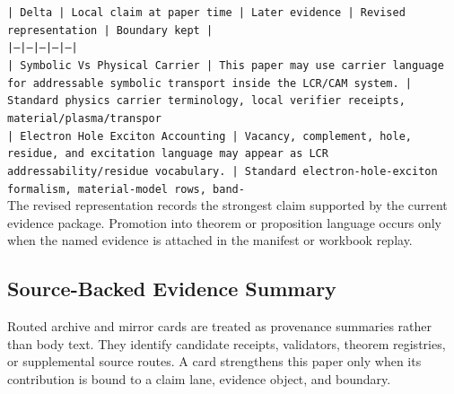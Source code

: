\documentclass[11pt]{article}
\begin{document}
\noindent\texttt{| Delta | Local claim at paper time | Later evidence | Revised representation | Boundary kept |}\\
\noindent\texttt{|---|---|---|---|---|}\\
\noindent\texttt{| Symbolic Vs Physical Carrier | This paper may use carrier language for addressable symbolic transport inside the LCR/CAM system. | Standard physics carrier terminology, local verifier receipts, material/plasma/transpor}\\
\noindent\texttt{| Electron Hole Exciton Accounting | Vacancy, complement, hole, residue, and excitation language may appear as LCR addressability/residue vocabulary. | Standard electron-hole-exciton formalism, material-model rows, band-}\\

The revised representation records the strongest claim supported by the current evidence package. Promotion into theorem or proposition language occurs only when the named evidence is attached in the manifest or workbook replay.

\subsection*{Source-Backed Evidence Summary}

Routed archive and mirror cards are treated as provenance summaries rather than
body text. They identify candidate receipts, validators, theorem registries, or
supplemental source routes. A card strengthens this paper only when its
contribution is bound to a claim lane, evidence object, and boundary.
\end{document}
